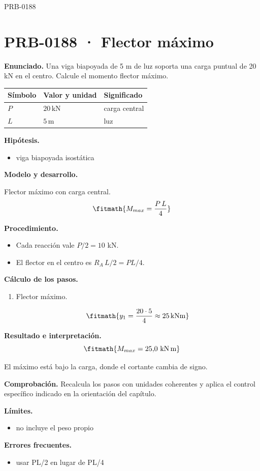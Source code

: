 \begin{studiumworked}{PRB-0188}

\section{PRB-0188 · Flector máximo}

\textbf{Enunciado.} Una viga biapoyada de 5 m de luz soporta una carga puntual de 20 kN en el centro. Calcule el momento flector máximo.

\par\medskip\noindent\begin{tabular}{@{}p{.18\linewidth}p{.26\linewidth}p{.48\linewidth}@{}}
\toprule Símbolo & Valor y unidad & Significado\\\midrule
$P$ & $20\,\mathrm{kN}$ & carga central\\
$L$ & $5\,\mathrm{m}$ & luz\\
\bottomrule\end{tabular}\par\medskip

\textbf{Hipótesis.}\begin{itemize}\item viga biapoyada isostática\end{itemize}

\textbf{Modelo y desarrollo.}

Flector máximo con carga central.\[\fitmath{M_{max} = \frac{P\,L}{4}}\]

\textbf{Procedimiento.}\begin{itemize}\item Cada reacción vale $P/2 = 10$ kN.
\item El flector en el centro es $R_A\,L/2 = P L/4$.\end{itemize}

\textbf{Cálculo de los pasos.}

\begin{enumerate}

\item Flector máximo.

\[\fitmath{y_{1}=\frac{20\cdot 5}{4}\approx 25\,\mathrm{kN m}}\]

\end{enumerate}

\textbf{Resultado e interpretación.}\[\fitmath{M_{max} = 25{,}0\ \mathrm{kN\,m}}\]

El máximo está bajo la carga, donde el cortante cambia de signo.

\par\textbf{Comprobación.} Recalcula los pasos con unidades coherentes y aplica el control específico indicado en la orientación del capítulo.

\textbf{Límites.}\begin{itemize}\item no incluye el peso propio\end{itemize}

\textbf{Errores frecuentes.}\begin{itemize}\item usar PL/2 en lugar de PL/4\end{itemize}

\end{studiumworked}

